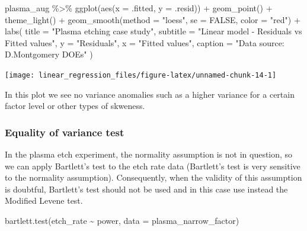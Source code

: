\documentclass[
]{book}
\newenvironment{Shaded}{\begin{snugshade}}{\end{snugshade}}
\newcommand{\AttributeTok}[1]{\textcolor[rgb]{0.77,0.63,0.00}{#1}}
\newcommand{\ConstantTok}[1]{\textcolor[rgb]{0.00,0.00,0.00}{#1}}
\newcommand{\FunctionTok}[1]{\textcolor[rgb]{0.00,0.00,0.00}{#1}}
\newcommand{\NormalTok}[1]{#1}
\newcommand{\SpecialCharTok}[1]{\textcolor[rgb]{0.00,0.00,0.00}{#1}}
\newcommand{\StringTok}[1]{\textcolor[rgb]{0.31,0.60,0.02}{#1}}
\begin{document}
\begin{Shaded}
\begin{Highlighting}[]
\NormalTok{plasma\_aug }\SpecialCharTok{\%\textgreater{}\%}
  \FunctionTok{ggplot}\NormalTok{(}\FunctionTok{aes}\NormalTok{(}\AttributeTok{x =}\NormalTok{ .fitted, }\AttributeTok{y =}\NormalTok{ .resid)) }\SpecialCharTok{+}
  \FunctionTok{geom\_point}\NormalTok{() }\SpecialCharTok{+}
  \FunctionTok{theme\_light}\NormalTok{() }\SpecialCharTok{+}
  \FunctionTok{geom\_smooth}\NormalTok{(}\AttributeTok{method =} \StringTok{"loess"}\NormalTok{, }\AttributeTok{se =} \ConstantTok{FALSE}\NormalTok{, }\AttributeTok{color =} \StringTok{"red"}\NormalTok{) }\SpecialCharTok{+}
  \FunctionTok{labs}\NormalTok{(}
    \AttributeTok{title =} \StringTok{"Plasma etching case study"}\NormalTok{,}
    \AttributeTok{subtitle =} \StringTok{"Linear model {-} Residuals vs Fitted values"}\NormalTok{,}
    \AttributeTok{y =} \StringTok{"Residuals"}\NormalTok{,}
    \AttributeTok{x =} \StringTok{"Fitted values"}\NormalTok{,}
    \AttributeTok{caption =} \StringTok{"Data source: D.Montgomery DOEs"}
\NormalTok{  )}
\end{Highlighting}
\end{Shaded}

\texttt{[image: linear\_regression\_files/figure-latex/unnamed-chunk-14-1]}

In this plot we see no variance anomalies such as a higher variance for a certain factor level or other types of skweness.

\hypertarget{barlettTest}{%
\subsubsection{Equality of variance test}\label{barlettTest}}

In the plasma etch experiment, the normality assumption is not in question, so we can apply Bartlett's test to the etch rate data (Bartlett's test is very sensitive to the normality assumption). Consequently, when the validity of this assumption is doubtful, Bartlett's test should not be used and in this case use instead the Modified Levene test.

\begin{Shaded}
\begin{Highlighting}[]
\FunctionTok{bartlett.test}\NormalTok{(etch\_rate }\SpecialCharTok{\textasciitilde{}}\NormalTok{ power, }\AttributeTok{data =}\NormalTok{ plasma\_narrow\_factor)}
\end{Highlighting}
\end{Shaded}
\end{document}
